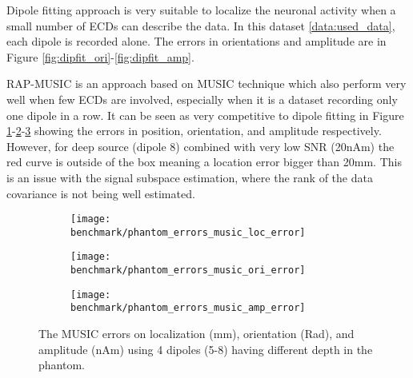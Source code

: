 Dipole fitting approach is very suitable to localize the neuronal activity when a small number of \ac{ECD}s can describe the data. In this dataset \ref{data:used_data}, each dipole is recorded alone. The errors in orientations and amplitude are in Figure \ref{fig:dipfit_ori}-\ref{fig:dipfit_amp}.

RAP-MUSIC is an approach based on MUSIC technique which also perform very well when few ECDs are involved, especially when it is a dataset recording only one dipole in a row. It can be seen as very competitive to dipole fitting in Figure \ref{fig:music_pos}-\ref{fig:music_ori}-\ref{fig:music_amp} showing the errors in position, orientation, and amplitude respectively. However, for deep source (dipole 8) combined with very low SNR (20nAm) the red curve is outside of the box meaning a location error bigger than 20mm. This is an issue with the signal subspace estimation, where the rank of the data covariance is not being well estimated.

\begin{sidewaysfigure}[ht]
        \centering
        \begin{subfigure}[b]{0.28\textwidth}
            \centering
            \texttt{[image: benchmark/phantom\_errors\_music\_loc\_error]}
            \caption{\label{fig:music_pos}}
        \end{subfigure}
		\hspace{35pt}
        \begin{subfigure}[b]{0.28\textwidth}  
            \centering 
            \texttt{[image: benchmark/phantom\_errors\_music\_ori\_error]}
            \caption{\label{fig:music_ori}}
        \end{subfigure}
		\hspace{35pt}
        \begin{subfigure}[b]{0.28\textwidth}   
            \centering 
            \texttt{[image: benchmark/phantom\_errors\_music\_amp\_error]}
            \caption{\label{fig:music_amp}}
        \end{subfigure}

		\caption{The MUSIC errors on localization (mm), orientation (Rad), and amplitude (nAm) using 4 dipoles (5-8) having different depth in the phantom.\label{fig:music_errors}}
\end{sidewaysfigure}


